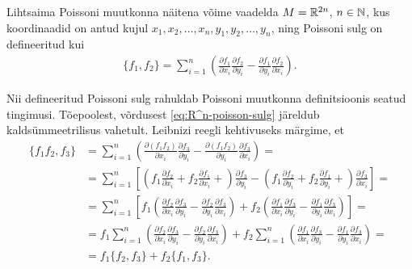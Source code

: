 Lihtsaima Poissoni muutkonna näitena võime vaadelda $M = \mathbb{R}^{2n}$, $n \in \mathbb{N}$,
kus koordinaadid on antud kujul $x_1, x_2, \dots, x_n, y_1, y_2, \dots, y_n$,
ning Poissoni sulg on defineeritud kui
\begin{align}\label{eq:R^n-poisson-sulg}
    \{f_1, f_2\} = \sum_{i=1}^{n} \left(
        \frac{\partial f_1}{\partial x_i} \frac{\partial f_2}{\partial y_i} -
        \frac{\partial f_1}{\partial y_i} \frac{\partial f_2}{\partial x_i}
    \right).
\end{align}

Nii defineeritud Poissoni sulg rahuldab Poissoni muutkonna definitsioonis
seatud tingimusi. Tõepoolest, võrdusest \eqref{eq:R^n-poisson-sulg}
järeldub kaldsümmeetrilisus vahetult. Leibnizi reegli kehtivuseks
märgime, et
\begin{align*}
    \{f_1 f_2, f_3\} &= \sum_{i=1}^{n} \left(
        \frac{\partial (f_1 f_2)}{\partial x_i}
        \frac{\partial f_3}{\partial y_i} -
        \frac{\partial (f_1 f_2)}{\partial y_i}
        \frac{\partial f_3}{\partial x_i}
    \right) = \\
    &= \sum_{i=1}^{n} \left[
        \left(
            f_1 \frac{\partial f_2}{\partial x_i} +
            f_2 \frac{\partial f_1}{\partial x_i} +
        \right) \frac{\partial f_3}{\partial y_i} -
        \left(
            f_1 \frac{\partial f_2}{\partial y_i} +
            f_2 \frac{\partial f_1}{\partial y_i} +
        \right) \frac{\partial f_3}{\partial x_i}
    \right] = \\
    &= \sum_{i=1}^{n} \left[
        f_1 \left(
            \frac{\partial f_2}{\partial x_i}
            \frac{\partial f_3}{\partial y_i} -
            \frac{\partial f_2}{\partial y_i}
            \frac{\partial f_3}{\partial x_i}
        \right) +
        f_2 \left(
            \frac{\partial f_1}{\partial x_i}
            \frac{\partial f_3}{\partial y_i} -
            \frac{\partial f_1}{\partial y_i}
            \frac{\partial f_3}{\partial x_i}
        \right)
    \right] = \\
    &= f_1 \sum_{i=1}^{n} \left(
            \frac{\partial f_2}{\partial x_i}
            \frac{\partial f_3}{\partial y_i} -
            \frac{\partial f_2}{\partial y_i}
            \frac{\partial f_3}{\partial x_i}
        \right) +
        f_2 \sum_{i=1}^{n} \left(
                \frac{\partial f_1}{\partial x_i}
                \frac{\partial f_3}{\partial y_i} -
                \frac{\partial f_1}{\partial y_i}
                \frac{\partial f_3}{\partial x_i}
        \right) = \\
    &= f_1 \{f_2, f_3\} + f_2 \{f_1, f_3\}.
\end{align*}

